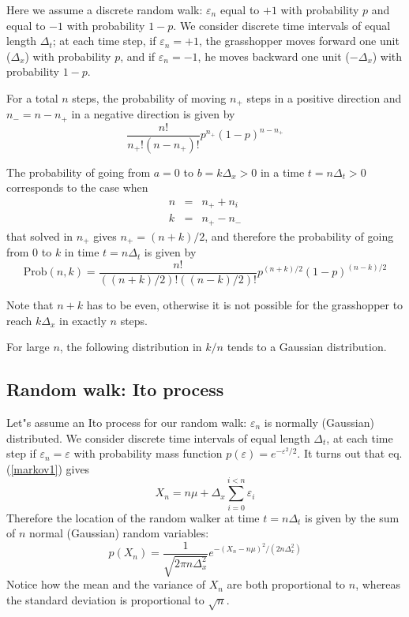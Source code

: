 \documentclass[justified, sixbynine]{tufte-book}
\theoremstyle{plain}%
\newtheorem * {corollary}{Corollary}
\theoremstyle{definition}
\theoremstyle{remark}
\newtheorem * {remark}{Remark}
\newtheorem * {note}{Note}
\begin{document}
\begin{fullwidth}
Here we assume a discrete  random walk: $\varepsilon _n$ equal to
$+1$ with probability $p$ and equal to $-1$ with probability $1-p.$ We
consider discrete time intervals of equal length $\Delta _t$; at each time
step, if $\varepsilon _n=+1$, the grasshopper moves forward one unit ($\Delta _x$)
with probability $p$, and if $\varepsilon _n=-1$, he moves backward one
unit ($-\Delta _x$) with probability $1-p$.

For a total $n$ steps, the probability of moving $n_{+}$ steps in a positive
direction and $n_{-}=n-n_{+}$ in a negative direction is given by
\begin{equation}
\frac{n!}{n_{+}!(n-n_{+})!}p^{n_{+}}(1-p)^{n-n_{+}}
\end{equation}

The probability of going from $a=0$ to $b=k\Delta _x>0$ in a time $t=n\Delta
_t>0$ corresponds to the case when
\begin{eqnarray}
n &=&n_{+}+n_i \\
k &=&n_{+}-n_{-}
\end{eqnarray}
that solved in $n_{+}$ gives $n_{+}=(n+k)/2$, and therefore the probability
of going from $0$ to $k$ in time $t=n\Delta _t$ is given by
\begin{equation}
\textrm{Prob}(n, k)=\frac{n!}{((n+k)/2)!((n-k)/2)!}p^{(n+k)/2}(1-p)^{(n-k)/2}
\end{equation}

Note that $n+k$ has to be even, otherwise it is not possible for the
grasshopper to reach $k\Delta _x$ in exactly $n$ steps.

For large $n$, the following distribution in $k/n$ tends to a Gaussian distribution.

\goodbreak\subsection{Random walk: Ito process}

Let"s assume an Ito process for our random walk: $\varepsilon _n$ is normally
(Gaussian) distributed. We consider discrete time intervals of equal length $%
\Delta _t$, at each time step if $\varepsilon _n=\varepsilon $ with
probability mass function $p(\varepsilon )=e^{-\varepsilon ^2/2}$. It turns
out that eq.(\ref{markov1}) gives
\begin{equation}
X_n = n \mu + \Delta _x\sum_{i=0}^{i<n}\varepsilon _i
\end{equation}
Therefore the location of the random walker at time $t=n\Delta _t$ is given
by the sum of $n$ normal (Gaussian) random variables:
\begin{equation}
p(X_n)=\frac 1{\sqrt{2\pi n\Delta _x^2}}e^{-(X_n - n\mu)^2/(2n\Delta _x^2)}
\end{equation}
Notice how the mean and the variance of $X_n$ are both proportional
to $n$, whereas the standard deviation is proportional to $\sqrt{n}$.


\end{fullwidth}
\end{document}

